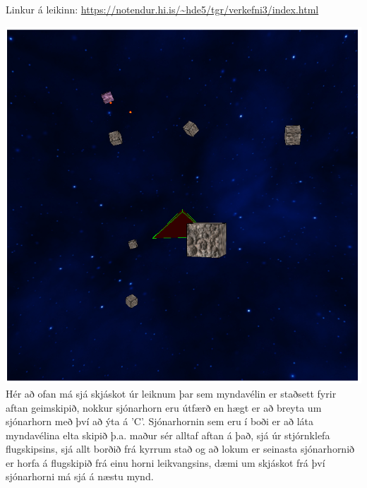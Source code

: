 \documentclass[11pt]{article}
\title{
\huge\nafnanamskeidi\\
\nafnaverkefni\vspace{\haednemanda}}
\author{\nafnakennara\\
        \nafnanemanda\\
        \netfangnemanda\vspace{\haeddagsetningar}}
\date{\dagsetning\vspace{\haedtexta}}
\begin{document}
\maketitle
\thispagestyle{bls1}
\begin{flushleft}
Linkur á leikinn:
\url{https://notendur.hi.is/~hde5/tgr/verkefni3/index.html}\vspace{-4mm}

{\centering\includegraphics[scale = 0.2]{m1.png}\\}
Hér að ofan má sjá skjáskot úr leiknum þar sem myndavélin er staðsett fyrir aftan geimskipið, nokkur sjónarhorn eru útfærð en hægt er að breyta um sjónarhorn með því að ýta á 'C'. Sjónarhornin sem eru í boði er að láta myndavélina elta skipið þ.a. maður sér alltaf aftan á það, sjá úr stjórnklefa flugskipsins, sjá allt borðið frá kyrrum stað og að lokum er seinasta sjónarhornið er horfa á flugskipið frá einu horni leikvangsins, dæmi um skjáskot frá því sjónarhorni má sjá á næstu mynd.\par

\end{flushleft}
\end{document}
